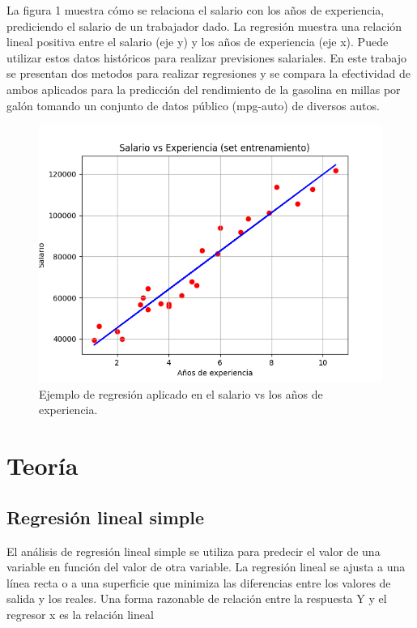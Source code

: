 \documentclass[conference]{IEEEtran}
\begin{document}
La figura 1 muestra cómo se relaciona el salario con los años de experiencia, prediciendo el salario de un trabajador dado. La regresión muestra una relación lineal positiva entre el salario (eje y) y los años de experiencia (eje x). Puede utilizar estos datos históricos para realizar previsiones salariales. En este trabajo se presentan dos metodos para realizar regresiones y se compara la efectividad de ambos aplicados para la predicción del rendimiento de la gasolina en millas por galón tomando un conjunto de datos público (mpg-auto) de diversos autos.

\begin{figure}[h]
    \centering
    \includegraphics[scale=0.6]{1.png}
    \caption{Ejemplo de regresión aplicado en el salario vs los años de experiencia.}
    \label{fig:mesh1}
\end{figure}

\section{Teoría}
\subsection{Regresión lineal simple}
El análisis de regresión lineal simple se utiliza para predecir el valor de una variable en función del valor de otra variable. La regresión lineal se ajusta a una línea recta o a una superficie que minimiza las diferencias entre los valores de salida y los reales. Una forma razonable de relación entre la respuesta Y y el regresor x es la relación lineal
\end{document}
